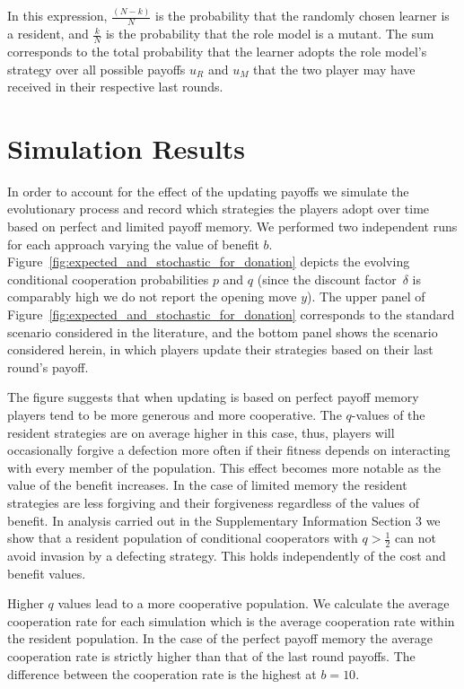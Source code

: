 \documentclass[11pt]{article}
\theoremstyle{plainCl1}
\theoremstyle{plainCl2}
\begin{document}
In this expression, $\frac{(N\!-\!k)}{N}$ is the probability that the randomly
chosen learner is a resident, and $\frac{k}{N}$ is the probability that the role
model is a mutant. The sum corresponds to the total probability that the learner
adopts the role model's strategy over all possible payoffs $u_R$ and $u_M$ that
the two player may have received in their respective last rounds.

\section{Simulation Results}

In order to account for the effect of the updating payoffs we simulate the
evolutionary process and record which strategies the players adopt over time
based on perfect and limited payoff memory. We performed two independent runs
for each approach varying the value of benefit \(b\).
Figure~\ref{fig:expected_and_stochastic_for_donation} depicts the evolving
conditional cooperation probabilities $p$ and $q$ (since the discount
factor~$\delta$ is comparably high we do not report the opening move \(y\)). The
upper panel of Figure~\ref{fig:expected_and_stochastic_for_donation} corresponds
to the standard scenario considered in the literature, and the bottom panel
shows the scenario considered herein, in which players update their strategies
based on their last round's payoff.

The figure suggests that when updating is based on perfect payoff memory players
tend to be more generous and more cooperative. The $q$-values of the resident
strategies are on average higher in this case, thus, players will occasionally
forgive a defection more often if their fitness depends on interacting with
every member of the population. This effect becomes more notable as the value of
the benefit increases. In the case of limited memory the resident strategies are
less forgiving and their forgiveness regardless of the values of benefit. In
analysis carried out in the Supplementary Information Section 3 we show that a
resident population of conditional cooperators with \(q > \frac{1}{2}\) can not
avoid invasion by a defecting strategy. This holds independently of the cost and
benefit values.

Higher $q$ values lead to a more cooperative population. We calculate the
average cooperation rate for each simulation which is the average cooperation
rate within the resident population. In the case of the perfect payoff memory 
the average cooperation rate is strictly higher than that of the last round
payoffs. The difference between the cooperation rate is the highest at $b=10$.
\end{document}
